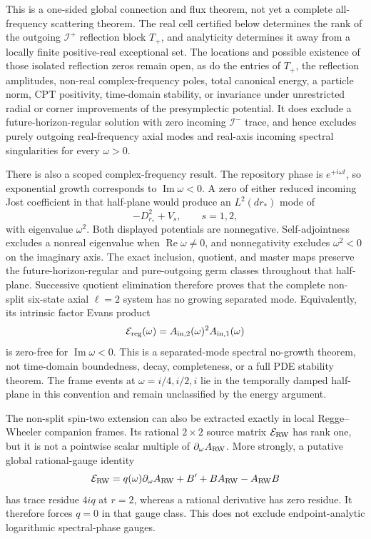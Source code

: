 \documentclass[11pt]{article}
\theoremstyle{definition}
\theoremstyle{remark}
\begin{document}
This is a one-sided global connection and flux theorem, not yet a complete
all-frequency scattering theorem.  The real cell certified below determines
the rank of the outgoing \(\mathscr I^+\) reflection block \(T_+\), and
analyticity determines it away from a locally finite positive-real
exceptional set.  The locations and possible existence of those isolated
reflection zeros remain open, as do the entries of \(T_+\), the reflection
amplitudes,
non-real complex-frequency poles, total canonical energy, a particle norm, CPT
positivity, time-domain stability, or invariance under unrestricted radial
or corner improvements of the presymplectic potential.
It does exclude a future-horizon-regular solution with zero incoming
\(\mathscr I^-\) trace, and hence excludes purely outgoing real-frequency
axial modes and real-axis incoming spectral singularities for every
\(\omega>0\).

There is also a scoped complex-frequency result.  The repository phase is
\(e^{+i\omega t}\), so exponential growth corresponds to
\(\operatorname{Im}\omega<0\).  A zero of either reduced incoming Jost
coefficient in that half-plane would produce an \(L^2(dr_*)\) mode of
\[
 -D_{r_*}^2+V_s,\qquad s=1,2,
\]
with eigenvalue \(\omega^2\).  Both displayed potentials are nonnegative.
Self-adjointness excludes a nonreal eigenvalue when
\(\operatorname{Re}\omega\ne0\), and nonnegativity excludes
\(\omega^2<0\) on the imaginary axis.  The exact inclusion, quotient, and
master maps preserve the future-horizon-regular and pure-outgoing germ
classes throughout that half-plane.  Successive quotient elimination
therefore proves that the complete non-split six-state axial \(\ell=2\)
system has no growing separated mode.  Equivalently, its intrinsic factor
Evans product
\[
 {\cal E}_{\rm reg}(\omega)
 =A_{{\rm in},2}(\omega)^2A_{{\rm in},1}(\omega)
\]
is zero-free for \(\operatorname{Im}\omega<0\).  This is a separated-mode
spectral no-growth theorem, not time-domain boundedness, decay,
completeness, or a full PDE stability theorem.  The frame events at
\(\omega=i/4,i/2,i\) lie in the temporally damped half-plane in this
convention and remain unclassified by the energy argument.

The non-split spin-two extension can also be extracted exactly in local
Regge--Wheeler companion frames.  Its rational \(2\times2\) source matrix
\(\mathcal E_{\rm RW}\) has rank one, but it is not a pointwise scalar
multiple of \(\partial_\omega A_{\rm RW}\).  More strongly, a putative
global rational-gauge identity
\[
 \mathcal E_{\rm RW}
 =q(\omega)\partial_\omega A_{\rm RW}
 +B'+BA_{\rm RW}-A_{\rm RW}B
\]
has trace residue \(4iq\) at \(r=2\), whereas a rational derivative has
zero residue.  It therefore forces \(q=0\) in that gauge class.  This does
not exclude endpoint-analytic logarithmic spectral-phase gauges.
\end{document}
